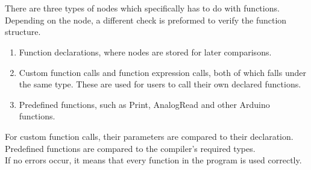 \\\\
There are three types of nodes which specifically has to do with functions. Depending on the node, a different check is preformed to verify the function structure.
\begin{enumerate}
    \item Function declarations, where nodes are stored for later comparisons.
    \item Custom function calls and function expression calls, both of which falls under the same type. These are used for users to call their own declared functions.
    \item Predefined functions, such as Print, AnalogRead and other Arduino functions.
\end{enumerate}
For custom function calls, their parameters are compared to their declaration. Predefined functions are compared to the compiler's required types.\\
If no errors occur, it means that every function in the program is used correctly.